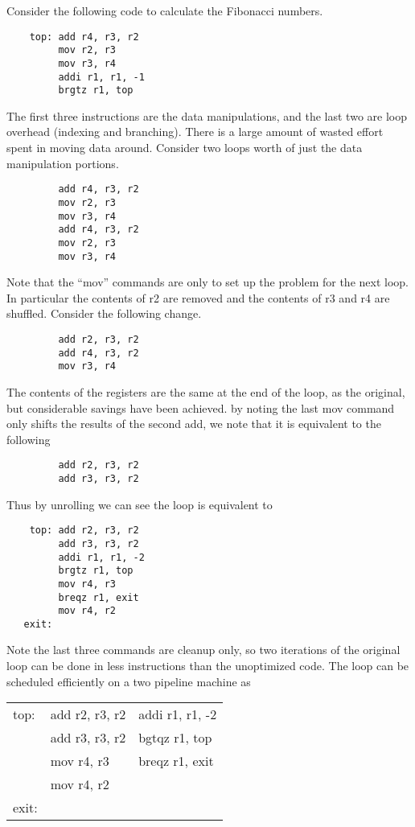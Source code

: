 \documentclass{article}
\begin{document}
Consider the following code to calculate the Fibonacci numbers.

\begin{verbatim}
    top: add r4, r3, r2
         mov r2, r3
         mov r3, r4
         addi r1, r1, -1
         brgtz r1, top
\end{verbatim}

The first three instructions are the data manipulations, and the last two are loop overhead (indexing and branching).  There is a large amount of wasted effort spent in moving data around.  Consider two loops worth of just the data manipulation portions.

\begin{verbatim}
         add r4, r3, r2
         mov r2, r3
         mov r3, r4
         add r4, r3, r2
         mov r2, r3
         mov r3, r4
\end{verbatim}

Note that the ``mov'' commands are only to set up the problem for the next loop.  In particular the contents of r2 are removed and the contents of r3 and r4 are shuffled.  Consider the following change.

\begin{verbatim}
         add r2, r3, r2
         add r4, r3, r2
         mov r3, r4
\end{verbatim}

The contents of the registers are the same at the end of the loop, as the original, but considerable savings have been achieved.  by noting the last mov command only shifts the results of the second add, we note that it is equivalent to the following

\begin{verbatim}
         add r2, r3, r2
         add r3, r3, r2
\end{verbatim}

Thus by unrolling we can see the loop is equivalent to


\begin{verbatim}
    top: add r2, r3, r2
         add r3, r3, r2
         addi r1, r1, -2
         brgtz r1, top
         mov r4, r3
         breqz r1, exit
         mov r4, r2
   exit:
\end{verbatim}

Note the last three commands are cleanup only, so two iterations of the original loop can be done in less instructions than the unoptimized code. The loop can be scheduled efficiently on a two pipeline machine as

\begin{tabular}{lll}
top:  & add r2, r3, r2 & addi r1, r1, -2 \\
      & add r3, r3, r2 & bgtqz r1, top   \\
      & mov r4, r3     & breqz r1, exit  \\
      & mov r4, r2     &                 \\
exit: &                &                 \\
\end{tabular}
\end{document}
